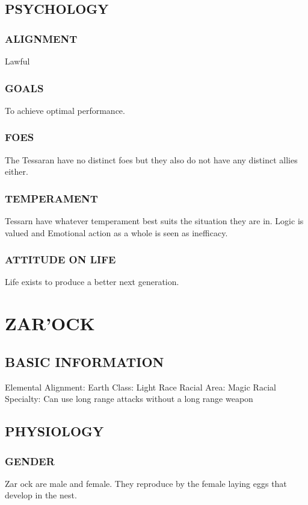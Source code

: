 \subsection{PSYCHOLOGY}
\subsubsection{ALIGNMENT}
Lawful
\subsubsection{GOALS}
To achieve optimal performance.
\subsubsection{FOES}
The Tessaran have no distinct foes but they also do not have any distinct
allies either.
\subsubsection{TEMPERAMENT}
Tessarn have whatever temperament best suits the situation they are in.  Logic
is valued and Emotional action as a whole is seen as inefficacy.
\subsubsection{ATTITUDE ON LIFE}
Life exists to produce a better next generation.
\section{ZAR'OCK}
\subsection{BASIC INFORMATION}
Elemental Alignment: Earth
Class: Light Race
Racial Area: Magic
Racial Specialty:  Can use long range attacks without a long range weapon
\subsection{PHYSIOLOGY}
\subsubsection{GENDER} 
Zar ock are male and female.  They reproduce by the female laying eggs that
develop in the nest.
